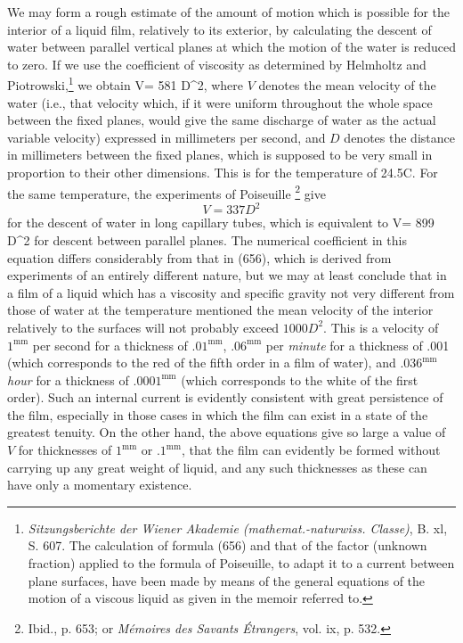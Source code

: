 \documentclass[12pt]{article}
\begin{document}
We may form a rough estimate of the amount of motion which is possible for the interior of a liquid film, relatively to its exterior, by calculating the descent of water between parallel vertical planes at which the motion of the water is reduced to zero. If we use the coefficient of viscosity as determined by Helmholtz and Piotrowski,\footnote{\textit{Sitzungsberichte der Wiener Akademie (mathemat.-naturwiss. Classe)}, B. xl, S. 607. The calculation of formula (656) and that of the factor (unknown fraction) %
applied to the formula of Poiseuille, to adapt it to a current between plane surfaces, have been made by means of the general equations of the motion of a viscous liquid as given in the memoir referred to.} we obtain
\eqs V= 581 D^2,    \label{656} \eqe
where $V$ denotes the mean velocity of the water (i.e., that velocity
which, if it were uniform throughout the whole space between the fixed planes, would give the same discharge of water as the actual variable velocity) expressed in millimeters per second, and $D$ denotes the distance in millimeters between the fixed planes, which is supposed to be very small in proportion to their other dimensions. This is for the temperature of 24.5\degree C. For the same temperature, the experiments of Poiseuille \footnote{Ibid., p. 653; or \textit{M\'{e}moires des Savants \'{E}trangers}, vol. ix, p. 532.} give
$$V= 337 D^2$$
for the descent of water in long capillary tubes, which is equivalent to
\eqs V= 899 D^2   \label{657} \eqe
for descent between parallel planes. The numerical coefficient in this equation differs considerably from that in (656), which is derived from experiments of an entirely different nature, but we may at least conclude that in a film of a liquid which has a viscosity and specific gravity not very different from those of water at the temperature mentioned the mean velocity of the interior relatively to the surfaces will not probably exceed $1000 D^2$. This is a velocity of $1^{\text{mm}}$ per second for a thickness of $.01^{\text{mm}}$, $.06^{\text{mm}}$ per \textit{minute} for a thickness of .001 (which corresponds to the red of the fifth order in a film of water), and $.036^{\text{mm}}$ \textit{hour} for a thickness of $.0001^{\text{mm}}$ (which corresponds to the white of the first order). Such an internal current is evidently consistent with great persistence of the film, especially in those cases in which the film can exist in a state of the greatest tenuity. On the other hand, the above equations give so large a value of $V$ for thicknesses of $1^{\text{mm}}$ or $.1^{\text{mm}}$, that the film can evidently be formed without carrying up any great weight of liquid, and any such thicknesses as these can have only a momentary existence.
\end{document}
